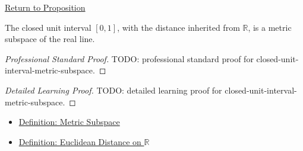 \newpage
{}
\label{prf:closed-unit-interval-metric-subspace}

\begin{remark*}[Return]
\hyperref[prop:closed-unit-interval-metric-subspace]{Return to Proposition}
\end{remark*}

\begin{proposition*}
The closed unit interval \([0,1]\), with the distance inherited from
\(\mathbb{R}\), is a metric subspace of the real line.
\end{proposition*}

\begin{proof}[Professional Standard Proof]
\LRAProofBodyStart
TODO: professional standard proof for closed-unit-interval-metric-subspace.
\end{proof}

\begin{proof}[Detailed Learning Proof]
\LRAProofBodyStart
TODO: detailed learning proof for closed-unit-interval-metric-subspace.
\end{proof}

\begin{remark*}
\end{remark*}

\begin{dependencies}
\begin{itemize}
  \item \hyperref[def:metric-subspace]{Definition: Metric Subspace}
  \item \hyperref[def:real-line-euclidean-distance]{Definition: Euclidean Distance on \(\mathbb{R}\)}
\end{itemize}
\end{dependencies}

\clearpage
